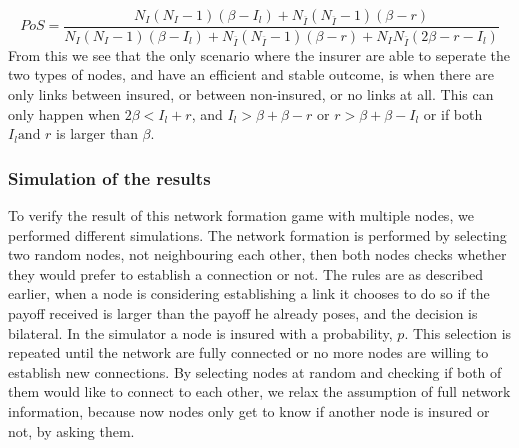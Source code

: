 \begin{equation}
PoS=\frac{N_{I}(N_{I}-1)(\beta-I_{l})+N_{\overline{I}}(N_{\overline{I}}-1)(\beta-r)}{N_{I}(N_{I}-1)(\beta-I_{l})+N_{\overline{I}}(N_{\overline{I}}-1)(\beta-r)+N_{I}N_{\overline{I}}(2\beta-r-I_{l})}
\label{eq:model2-pos}
\end{equation}
From this we see that the only scenario where the insurer are able to seperate the two types of nodes, and have an efficient and stable outcome, is when there are only links between insured, or between non-insured, or no links at all.
This can only happen when $2\beta<I_{l}+r$, and $I_{l}>\beta+\beta-r$ or $r>\beta+\beta-I_{l}$ or if both $I_{l} \text{and }r$ is larger than $\beta$.

\subsubsection{Simulation of the results}
To verify the result of this network formation game with multiple nodes, we performed different simulations. The network formation is performed by selecting two random nodes, not neighbouring each other, then both nodes checks whether they would prefer to establish a connection or not. 
The rules are as described earlier, when a node is considering establishing a link it chooses to do so if the payoff received is larger than the payoff he already poses, and the decision is bilateral.
In the simulator a node is insured with a probability, $p$. This selection is repeated until the network are fully connected or no more nodes are willing to establish new connections.
By selecting nodes at random and checking if both of them would like to connect to each other, we relax the assumption of full network information, because now nodes only get to know if another node is insured or not, by asking them.

